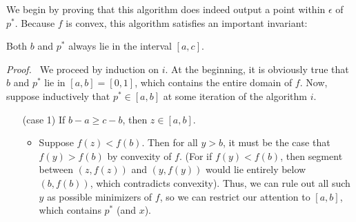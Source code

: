 \begin{lproof}
\begin{minipage}{0.49\linewidth}
\end{minipage}

    We begin by proving that this algorithm does indeed output
    a point within $\epsilon$ of
    $p^*
    $.
    Because $f$ is convex,
    this algorithm satisfies an important invariant: 
    
    \begin{iclaim} \label{claim:reduction-works}
    Both $b$ and $p^*$
    always lie in the interval $[a,c]$.
    \end{iclaim}
    \textit{Proof.~}
        We proceed by induction on $i$.
        At the beginning, it is obviously true that $b$ and $p^*$ lie in
        $[a,b] = [0,1]$, which contains the entire domain of $f$.
        Now, suppose inductively that $p^* \in [a,b]$ at some
        iteration of the algorithm $i$.
        \begin{itemize}[leftmargin=4em]
            \item [(case 1)] If $b-a \ge c-b$, then $z \in [a,b]$.
            \begin{itemize}[leftmargin=-1em]
                \item Suppose $f(z) < f(b)$. Then for
                all $y > b$, it must be the case that $f(y) > f(b)$ by convexity of $f$.
                (For if $f(y) < f(b)$, then segment between $(z, f(z))$ and $(y, f(y))$ would lie entirely below $(b, f(b))$, which contradicts convexity).
                Thus, we can rule out all such $y$ as possible minimizers of $f$, so
                we can restrict our attention to $[a, b]$, which contains $p^*$ (and $x$).


\end{itemize}
\end{itemize}
\end{lproof}
